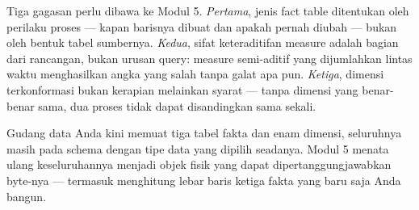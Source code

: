 Tiga gagasan perlu dibawa ke Modul 5. \emph{Pertama}, jenis fact table
ditentukan oleh perilaku proses --- kapan barisnya dibuat dan apakah pernah
diubah --- bukan oleh bentuk tabel sumbernya. \emph{Kedua}, sifat keteraditifan
measure adalah bagian dari rancangan, bukan urusan query: measure semi-aditif
yang dijumlahkan lintas waktu menghasilkan angka yang salah tanpa galat apa
pun. \emph{Ketiga}, dimensi terkonformasi bukan kerapian melainkan syarat ---
tanpa dimensi yang benar-benar sama, dua proses tidak dapat disandingkan sama
sekali.

Gudang data Anda kini memuat tiga tabel fakta dan enam dimensi, seluruhnya
masih pada schema  dengan tipe data yang dipilih seadanya.
Modul 5 menata ulang keseluruhannya menjadi objek fisik yang dapat
dipertanggungjawabkan byte-nya --- termasuk menghitung lebar baris ketiga fakta
yang baru saja Anda bangun.
